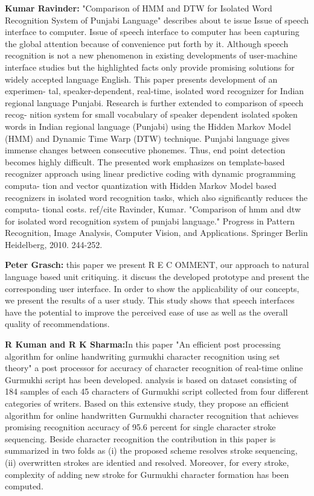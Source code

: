 \documentclass[12pt,a4paper,oldfontcommands]{memoir}
\begin{document}
\textbf{Kumar Ravinder:} "Comparison of HMM and DTW for Isolated Word Recognition System of Punjabi Language" describes about te issue Issue of speech interface to computer.
Issue of speech interface to computer has been capturing the global
attention because of convenience put forth by it. Although speech recognition is
not a new phenomenon in existing developments of user-machine interface
studies but the highlighted facts only provide promising solutions for widely
accepted language English. This paper presents development of an experimen-
tal, speaker-dependent, real-time, isolated word recognizer for Indian regional
language Punjabi. Research is further extended to comparison of speech recog-
nition system for small vocabulary of speaker dependent isolated spoken words
in Indian regional language (Punjabi) using the Hidden Markov Model (HMM)
and Dynamic Time Warp (DTW) technique. Punjabi language gives immense
changes between consecutive phonemes. Thus, end point detection becomes
highly difficult. The presented work emphasizes on template-based recognizer
approach using linear predictive coding with dynamic programming computa-
tion and vector quantization with Hidden Markov Model based recognizers in
isolated word recognition tasks, which also significantly reduces the computa-
tional costs. ref/cite Ravinder, Kumar. "Comparison of hmm and dtw for isolated word recognition system of punjabi language." Progress in Pattern Recognition, Image Analysis, Computer Vision, and Applications. Springer Berlin Heidelberg, 2010. 244-252\cite{13}.

\textbf{Peter Grasch:} this paper we present R E C OMMENT, our
approach to natural language based unit critiquing. it discuss the
developed prototype and present the corresponding user interface.
In order to show the applicability of our concepts, we present the
results of a user study. This study shows that speech interfaces
have the potential to improve the perceived ease of use as well as
the overall quality of recommendations\cite{14}.  

\textbf{R Kuman and R K Sharma:}In this paper "An efficient post processing algorithm for online handwriting gurmukhi character recognition using set theory" a post processor for accuracy of character recognition of real-time online Gurmukhi script has been developed.  analysis is based on dataset consisting of 184 samples of
each 45 characters of Gurmukhi script collected from four different categories of writers. Based
on this extensive study, they  propose an efficient  algorithm for online handwritten Gurmukhi
character recognition that achieves promising recognition accuracy of 95.6 percent for single character
stroke sequencing. Beside character recognition the contribution in this paper is summarized
in two folds as (i) the proposed scheme resolves stroke sequencing, (ii) overwritten strokes
are identied and resolved. Moreover, for every stroke, complexity of adding new stroke for
Gurmukhi character formation has been computed\cite{15}.  
\end{document}
